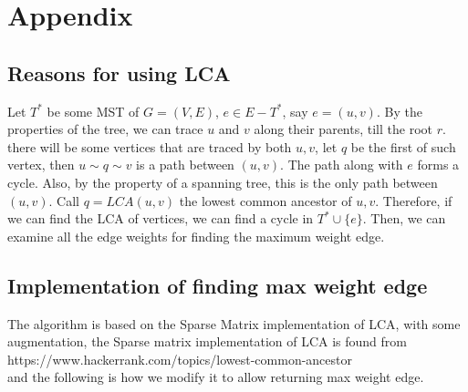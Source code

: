 \documentclass[11pt]{article}
\begin{document}
\section*{Appendix} 
\subsection*{\textbf{Reasons for using LCA}} Let $T^*$ be some MST of $G=(V,E)$, $e\in E-T^*$, say $e=(u,v)$. By the properties of the tree, we can trace $u$ and $v$ along their parents, till the root $r$. there will be some vertices that are traced by both $u,v$, let $q$ be the first of such vertex, then $u\sim q\sim v$ is a path between $(u,v)$. The path along with $e$ forms a cycle. Also, by the property of a spanning tree, this is the only path between $(u,v)$. Call $q=LCA(u,v)$ the lowest common ancestor of $u,v$. Therefore, if we can find the LCA of vertices, we can find a cycle in $T^*\cup\{e\}$. Then, we can examine all the edge weights for finding the maximum weight edge. \\

\subsection*{\textbf{Implementation of finding max weight edge}}
The algorithm is based on the Sparse Matrix implementation of LCA, with some augmentation, the Sparse matrix implementation of LCA is found from\\ https://www.hackerrank.com/topics/lowest-common-ancestor\\ and the following is how we modify it to allow returning max weight edge. \\
\end{document}
